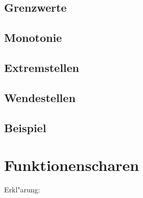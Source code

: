 \subsection{Grenzwerte}



\subsection{Monotonie}

\subsection{Extremstellen}

\subsection{Wendestellen}

\subsection{Beispiel}

	\section{Funktionenscharen}


Erkl"arung:\\

